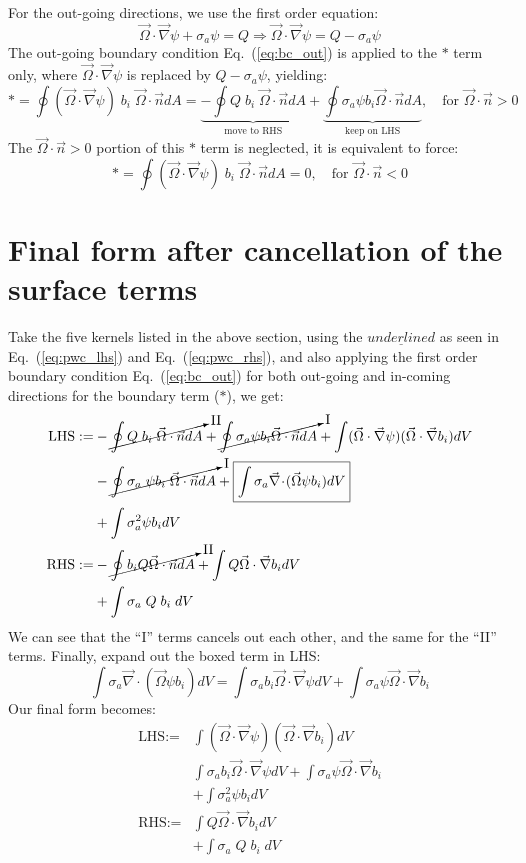 \documentclass{article}
\renewcommand{\div}{\vec{\nabla}\! \cdot \!}
\newcommand{\grad}{\vec{\nabla}}
\newcommand{\be}{\begin{equation}}
\newcommand{\ee}{\end{equation}}
\newcommand{\vo}{\vec{\Omega}}
\newcommand{\vn}{\vec{n}}
\newcommand{\eqt}[1]{Eq.~(\ref{#1})}                     %
\begin{document}
For the out-going directions, we use the first order equation:
\be
\vo\cdot\grad\psi + \sigma_a\psi = Q \Rightarrow \boxed{\vo\cdot\grad\psi = Q - \sigma_a\psi} \label{eq:bc_out}
\ee
The out-going boundary condition \eqt{eq:bc_out} is applied to the $*$ term only, where $\vo\cdot\grad\psi$ is replaced by $Q - \sigma_a\psi$, yielding:
\be
* = \oint(\vo\cdot\grad\psi)\;b_i\;\vo\cdot\vn dA = \underbrace{-\oint Q\;b_i\;\vo\cdot\vn dA}_\text{move to RHS} + \underbrace{\oint\sigma_a\psi b_i \vo\cdot\vn dA}_\text{keep on LHS}, \quad \text{for }\vo\cdot\vn>0
\ee
The $\vo\cdot\vn>0$ portion of this $*$ term is neglected, it is equivalent to force:
\be
* = \oint(\vo\cdot\grad\psi)\;b_i\;\vo\cdot\vn dA = 0, \quad \text{for }\vo\cdot\vn<0
\ee


\section{Final form after cancellation of the surface terms}
Take the five kernels listed in the above section, using the $\underline{underlined}$ as seen in \eqt{eq:pwc_lhs} and \eqt{eq:pwc_rhs}, and also applying the first order boundary condition \eqt{eq:bc_out} for both out-going and in-coming directions for the boundary term ($*$), we get:
\begin{align}
\text{LHS} :=&  -\cancelto{\text{II}}{\oint Q\;b_i\;\vo\cdot\vn dA} + \cancelto{\text{I}}{\oint\sigma_a\psi b_i \vo\cdot\vn dA} + \int (\vo\cdot\grad\psi)(\vo\cdot\grad b_i) dV \nonumber\\
             &  -\cancelto{\text{I}}{\oint \sigma_a\;\psi b_i\;\vo\cdot\vn dA} + \boxed{\int\sigma_a\div(\vo\psi b_i) dV} \nonumber\\
             &  +\int\sigma_a^2\psi b_i dV \\
\text{RHS} :=&  -\cancelto{\text{II}}{\oint b_iQ\vo\cdot\vn dA} + \int Q\vo\cdot\grad b_i dV  \nonumber\\
             &  + \int\sigma_a\;Q\;b_i\;dV
\end{align}
We can see that the ``I'' terms cancels out each other, and the same for the ``II'' terms. Finally, expand out the boxed term in LHS:
\be
\boxed{\int\sigma_a\div(\vo\psi b_i) dV} = \int\sigma_a b_i\vo\cdot\grad\psi dV + \int\sigma_a\psi\vo\cdot\grad b_i
\ee
Our final form becomes:
\begin{align}
\text{LHS} :=&  \int (\vo\cdot\grad\psi)(\vo\cdot\grad b_i) dV \nonumber\\
             &  \int\sigma_a b_i\vo\cdot\grad\psi dV + \int\sigma_a\psi\vo\cdot\grad b_i \nonumber\\
             &  +\int\sigma_a^2\psi b_i dV \\
\text{RHS} :=&  \int Q\vo\cdot\grad b_i dV  \nonumber\\
             &  + \int\sigma_a\;Q\;b_i\;dV
\end{align}
\end{document}
